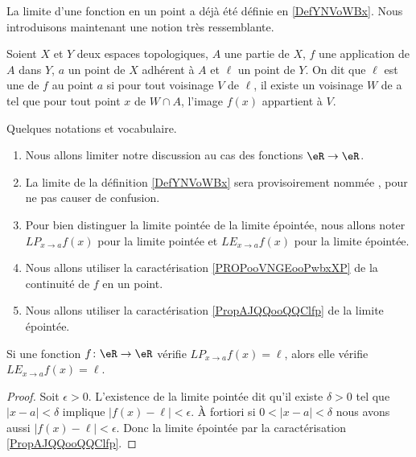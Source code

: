 La limite d'une fonction en un point a déjà été définie en \ref{DefYNVoWBx}. Nous introduisons maintenant une notion très ressemblante.

\begin{definition}     \label{DEFooBAPHooUtIaRS}
	Soient $X$ et $Y$ deux espaces topologiques, $A$ une partie de $X$, $f$ une application de $A$ dans $Y$, $a$ un point de $X$ adhérent à $A$ et \(\ell \) un point de $Y$. On dit que \( \ell\) est une  de $f$ au point $a$ si pour tout voisinage $V$ de \( \ell\), il existe un voisinage $W$ de a tel que pour tout point $x$ de $W\cap A$, l'image $f(x)$ appartient à $V$.
\end{definition}

Quelques notations et vocabulaire.
\begin{enumerate}
	\item
	      Nous allons limiter notre discussion au cas des fonctions \( \eR\to \eR\).
	\item
	      La limite de la définition \ref{DefYNVoWBx} sera provisoirement nommée , pour ne pas causer de confusion.
	\item
	      Pour bien distinguer la limite pointée de la limite épointée, nous allons noter \( {LP}_{x\to a}f(x)\) pour la limite pointée et \( {LE}_{x\to a}f(x)\) pour la limite épointée.
	\item
	      Nous allons utiliser la caractérisation \ref{PROPooVNGEooPwbxXP} de la continuité de \( f\) en un point.
	\item
	      Nous allons utiliser la caractérisation \ref{PropAJQQooQQClfp} de la limite épointée.
\end{enumerate}

\begin{lemma}       \label{LEMooWAZLooDPvemu}
	Si une fonction \( f\colon \eR\to \eR\) vérifie \( {LP}_{x\to a} f(x)=\ell\), alors elle vérifie \( {LE}_{x\to a}f(x)=\ell\).
\end{lemma}

\begin{proof}
	Soit \( \epsilon>0\). L'existence de la limite pointée dit qu'il existe \( \delta>0\) tel que \( | x-a |<\delta\) implique \( | f(x)-\ell |<\epsilon\). À fortiori si \( 0<| x-a |<\delta\) nous avons aussi \( | f(x)-\ell |<\epsilon\). Donc la limite épointée par la caractérisation \ref{PropAJQQooQQClfp}.
\end{proof}


